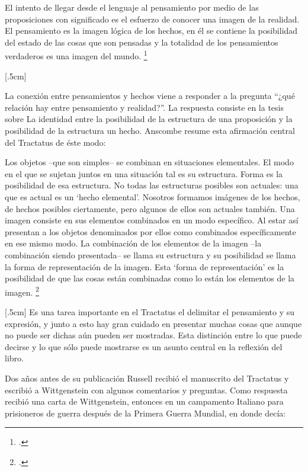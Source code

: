 \documentclass[../main.tex]{subfiles}
\begin{document}
El intento de llegar desde el lenguaje al pensamiento por medio de las proposiciones con significado es el esfuerzo de conocer una imagen de la realidad. El pensamiento es la imagen lógica de los hechos, en él se contiene la posibilidad del estado de las cosas que son pensadas y la totalidad de los pensamientos verdaderos es una imagen del mundo. \footcite[cf. 3 y 3.001]{tractatus}

[.5cm]

La conexión entre pensamientos y hechos viene a responder a la pregunta ``¿qué relación hay entre pensamiento y realidad?''. La respuesta consiste en la tesis sobre La identidad entre la posibilidad de la estructura de una proposición y la posibilidad de la estructura un hecho. Anscombe resume esta afirmación central del Tractatus de éste modo:

Los objetos --que son simples-- se combinan en situaciones elementales. El modo en el que se sujetan juntos en una situación tal es su estructura. Forma es la posibilidad de esa estructura. No todas las estructuras posibles son actuales: una que es actual es un `hecho elemental'. Nosotros formamos imágenes de los hechos, de hechos posibles ciertamente, pero algunos de ellos son actuales también. Una imagen consiste en sus elementos combinados en un modo específico. Al estar así presentan a los objetos denominados por ellos como combinados específicamente en ese mismo modo. La combinación de los elementos de la imagen --la combinación siendo presentada-- se llama su estructura y su posibilidad se llama la forma de representación de la imagen. 
Esta `forma de representación' es la posibilidad de que las cosas están combinadas como lo están los elementos de la imagen. \footcite[p. 171]{simplicity}

[.5cm]
Es una tarea importante en el Tractatus el delimitar el pensamiento y su expresión, y junto a esto hay gran cuidado en presentar muchas cosas que aunque no puede ser dichas aún pueden ser mostradas. Esta distinción entre lo que puede decirse y lo que sólo puede mostrarse es un asunto central en la reflexión del libro. 

Dos años antes de su publicación Russell recibió el manuscrito del Tractatus y escribió a Wittgenstein con algunos comentarios y preguntas. Como respuesta recibió una carta de Wittgenstein, entonces en un campamento Italiano para prisioneros de guerra después de la Primera Guerra Mundial, en donde decía:
\end{document}
